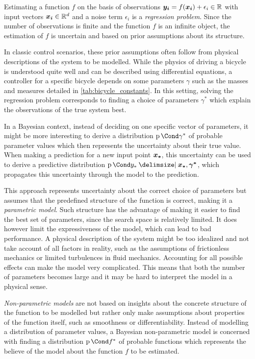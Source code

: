 Estimating a function $f$ on the basis of observations $\bm{y_i} = f(\bm{x_i}) + \epsilon_i \in \mathbb{R}$ with input vectors $\bm{x_i} \in \mathbb{R}^d$ and a noise term $\epsilon_i$ is a \emph{regression problem}.
Since the number of observations is finite and the function $f$ is an infinite object, the estimation of $f$ is uncertain and based on prior assumptions about its structure.

In classic control scenarios, these prior assumptions often follow from physical descriptions of the system to be modelled.
While the physics of driving a bicycle is understood quite well and can be described using differential equations, a controller for a specific bicycle depends on some parameters $\gamma$ such as the masses and measures detailed in \cref{tab:bicycle_constants}.
In this setting, solving the regression problem corresponds to finding a choice of parameters $\gamma^\ast$ which explain the observations of the true system best.

In a Bayesian context, instead of deciding on one specific vector of parameters, it might be more interesting to derive a distribution $\Prob{\gamma^*}$ of probable parameter values which then represents the uncertainty about their true value.
When making a prediction for a new input point $\bm{x_\ast}$, this uncertainty can be used to derive a predictive distribution $\Prob{y_\ast \given \mat{x_\ast}, \mat{\gamma^\ast}}$, which propagates this uncertainty through the model to the prediction.

This approach represents uncertainty about the correct choice of parameters but assumes that the predefined structure of the function is correct, making it a \emph{parametric model}.
Such structure has the advantage of making it easier to find the best set of parameters, since the search space is relatively limited.
It does however limit the expressiveness of the model, which can lead to bad performance.
A physical description of the system might be too idealized and not take account of all factors in reality, such as the assumptions of frictionless mechanics or limited turbulences in fluid mechanics.
Accounting for all possible effects can make the model very complicated.
This means that both the number of parameters becomes large and it may be hard to interpret the model in a physical sense.

\emph{Non-parametric models} are not based on insights about the concrete structure of the function to be modelled but rather only make assumptions about properties of the function itself, such as smoothness or differentiability.
Instead of modelling a distribution of parameter values, a Bayesian non-parametric model is concerned with finding a distribution $\Prob{f^\ast}$ of probable functions which represents the believe of the model about the function $f$ to be estimated.

